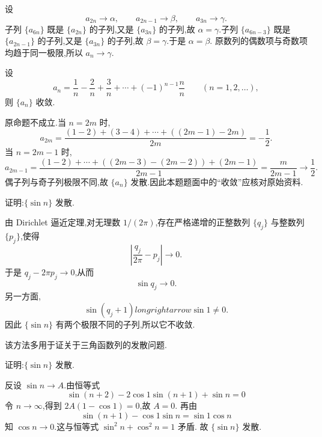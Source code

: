 \begin{solution}
  设
  \[
    a_{2n}\to\alpha,
    \qquad a_{2n-1}\to\beta,
    \qquad a_{3n}\to\gamma.
  \]
  子列 $\{a_{6n}\}$ 既是 $\{a_{2n}\}$ 的子列,又是 $\{a_{3n}\}$ 的子列,故
  $\alpha=\gamma$.子列 $\{a_{6n-3}\}$ 既是 $\{a_{2n-1}\}$ 的子列,又是
  $\{a_{3n}\}$ 的子列,故 $\beta=\gamma$.于是 $\alpha=\beta$.
  原数列的偶数项与奇数项均趋于同一极限,所以 $a_n\to\gamma$.
\end{solution}

\begin{example}
  设
  \[
    a_n=\dfrac{1}{n}-\dfrac{2}{n}+\dfrac{3}{n}+\cdots+(-1)^{n-1}\dfrac{n}{n}
    \qquad(n=1,2,\ldots),
  \]
  则 $\{a_n\}$ 收敛.
\end{example}
\exampleblank

\begin{solution}
  原命题不成立.当 $n=2m$ 时,
  \[
    a_{2m}=\dfrac{(1-2)+(3-4)+\cdots+((2m-1)-2m)}{2m}
    =-\dfrac{1}{2}.
  \]
  当 $n=2m-1$ 时,
  \[
    a_{2m-1}
    =\dfrac{(1-2)+\cdots+((2m-3)-(2m-2))+(2m-1)}{2m-1}
    =\dfrac{m}{2m-1}\longrightarrow\dfrac{1}{2}.
  \]
  偶子列与奇子列极限不同,故 $\{a_n\}$ 发散.因此本题题面中的“收敛”应核对原始资料.
\end{solution}

\begin{example}
  证明:$\{\sin n\}$ 发散.
\end{example}
\exampleblank

\begin{solution}
  由 Dirichlet 逼近定理,对无理数 $1/(2\pi)$,存在严格递增的正整数列
  $\{q_j\}$ 与整数列 $\{p_j\}$,使得
  \[
    \left|\dfrac{q_j}{2\pi}-p_j\right|\longrightarrow0.
  \]
  于是 $q_j-2\pi p_j\to0$,从而
  \[
    \sin q_j\longrightarrow0.
  \]
  另一方面,
  \[
    \sin(q_j+1)longrightarrow\sin1\neq0.
  \]
  因此 $\{\sin n\}$ 有两个极限不同的子列,所以它不收敛.
\end{solution}




该方法多用于证关于三角函数列的发散问题.

\begin{example}
  证明:$\{\sin n\}$ 发散.
\end{example}
\exampleblank

\begin{solution}
  反设 $\sin n\to A$.由恒等式
  \[
    \sin(n+2)-2\cos1\sin(n+1)+\sin n=0
  \]
  令 $n\to\infty$,得到 $2A(1-\cos1)=0$,故 $A=0$.
  再由
  \[
    \sin(n+1)-\cos1\sin n=\sin1\cos n
  \]
  知 $\cos n\to0$.这与恒等式 $\sin^2n+\cos^2n=1$ 矛盾.
  故 $\{\sin n\}$ 发散.
\end{solution}


